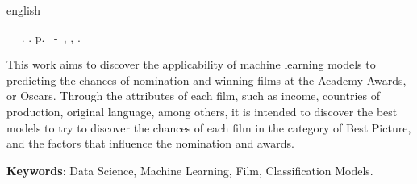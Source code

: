 \begin{resumo}[Abstract]
 \begin{otherlanguage*}{english}
	\begin{flushleft} 
		\setlength{\absparsep}{0pt} %
 		\SingleSpacing 
 		\imprimirautorabr~ ~\textbf{\imprimirtitleabstract}.	\imprimirdata.  \pageref{LastPage}p. 
		\imprimirtipotrabalho~-~\imprimirinstituicao, \imprimirlocal, 	\imprimirdata. 
 	\end{flushleft}
	\OnehalfSpacing 
   This work aims to discover the applicability of machine learning models to predicting the chances of nomination and winning films at the Academy Awards, or Oscars. Through the attributes of each film, such as income, countries of production, original language, among others, it is intended to discover the best models to try to discover the chances of each film in the category of Best Picture, and the factors that influence the nomination and awards.
 
   \vspace{\onelineskip}
 
   \noindent 
   \textbf{Keywords}: Data Science, Machine Learning, Film, Classification Models.
 \end{otherlanguage*}
\end{resumo}
